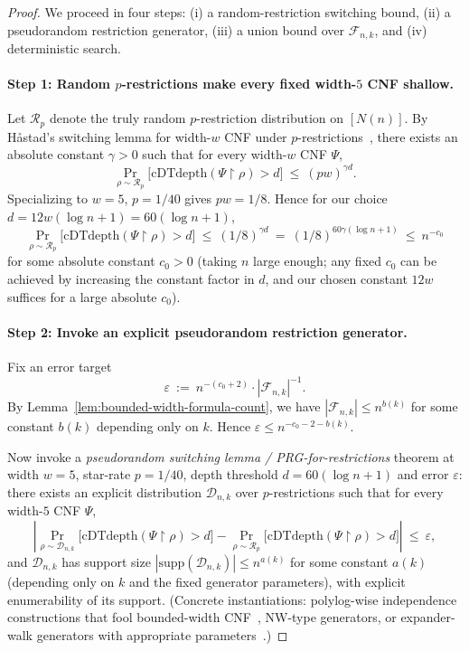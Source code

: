\documentclass[12pt]{article}
\theoremstyle{definition}
\theoremstyle{definition}
\theoremstyle{remark}
\theoremstyle{remark}
\begin{document}
\begin{proof}
We proceed in four steps: (i) a random-restriction switching bound, (ii) a pseudorandom
restriction generator, (iii) a union bound over $\mathcal{F}_{n,k}$, and (iv) deterministic search.

\paragraph{Step 1: Random $p$-restrictions make every fixed width-$5$ CNF shallow.}
Let $\mathcal{R}_p$ denote the truly random $p$-restriction distribution on $[N(n)]$.
By Håstad's switching lemma for width-$w$ CNF under $p$-restrictions~\cite{hastad1987},
there exists an absolute constant $\gamma>0$ such that for every width-$w$ CNF $\Psi$,
\[
\Pr_{\rho\sim\mathcal{R}_p}\!\big[\mathrm{cDTdepth}(\Psi\!\upharpoonright\!\rho) > d\big]
\ \le\ (p w)^{\gamma d}.
\]
Specializing to $w=5$, $p=1/40$ gives $pw=1/8$.  Hence for our choice
$d=12w(\log n+1)=60(\log n+1)$,
\[
\Pr_{\rho\sim\mathcal{R}_p}\!\big[\mathrm{cDTdepth}(\Psi\!\upharpoonright\!\rho) > d\big]
\ \le\ (1/8)^{\gamma d}
\ =\ (1/8)^{60\gamma(\log n+1)}
\ \le\ n^{-c_0}
\]
for some absolute constant $c_0>0$ (taking $n$ large enough; any fixed $c_0$ can be achieved
by increasing the constant factor in $d$, and our chosen constant $12w$ suffices for a
large absolute $c_0$).

\paragraph{Step 2: Invoke an explicit pseudorandom restriction generator.}
Fix an error target
\[
\varepsilon\ :=\ n^{-(c_0+2)}\cdot |\mathcal{F}_{n,k}|^{-1}.
\]
By Lemma~\ref{lem:bounded-width-formula-count}, we have $|\mathcal{F}_{n,k}|\le n^{b(k)}$
for some constant $b(k)$ depending only on $k$. Hence $\varepsilon\le n^{-c_0-2-b(k)}$.

Now invoke a \emph{pseudorandom switching lemma / PRG-for-restrictions} theorem at width $w=5$,
star-rate $p=1/40$, depth threshold $d=60(\log n+1)$ and error $\varepsilon$:
there exists an explicit distribution $\mathcal{D}_{n,k}$ over $p$-restrictions such that
for every width-$5$ CNF $\Psi$,
\[
\left|
\Pr_{\rho\sim\mathcal{D}_{n,k}}\!\big[\mathrm{cDTdepth}(\Psi\!\upharpoonright\!\rho) > d\big]
-
\Pr_{\rho\sim\mathcal{R}_p}\!\big[\mathrm{cDTdepth}(\Psi\!\upharpoonright\!\rho) > d\big]
\right|
\ \le\ \varepsilon,
\]
and $\mathcal{D}_{n,k}$ has support size $|\mathrm{supp}(\mathcal{D}_{n,k})|\le n^{a(k)}$ for
some constant $a(k)$ (depending only on $k$ and the fixed generator parameters), with
explicit enumerability of its support.
(Concrete instantiations: polylog-wise independence constructions that fool bounded-width
CNF~\cite{bazzi2009,braverman2010}, NW-type generators, or expander-walk generators with
appropriate parameters~\cite{hastad1987}.)


\end{proof}
\end{document}

